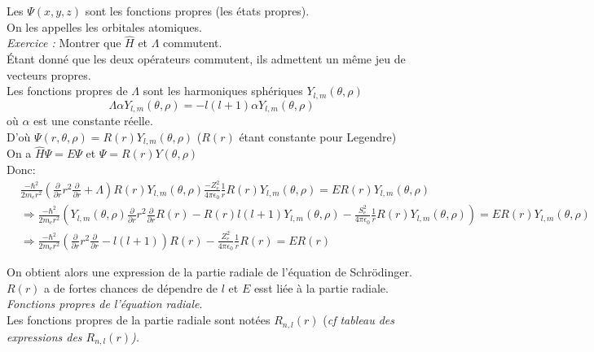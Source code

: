\documentclass[../main.tex]{subfile}
\begin{document}
 Les $\Psi(x,y,z)$ sont les fonctions propres (les états propres).\\
 On les appelles les orbitales atomiques.\\

 \emph{Exercice :} Montrer que $\hat{H}$ et $\Lambda$ commutent.\\


 Étant donné que les deux opérateurs commutent, ils admettent un même jeu de vecteurs propres.\\
 Les fonctions propres de $\Lambda$ sont les harmoniques sphériques $Y_{l,m}(\theta, \rho)$\\
 $$\Lambda \alpha Y_{l,m}(\theta, \rho) = -l(l+1) \alpha Y_{l,m}(\theta, \rho)$$
 où $\alpha$ est une constante réelle.\\

 D'où $\Psi(r, \theta, \rho) = R(r)Y_{l,m}(\theta, \rho)$ ($R(r)$ étant constante pour Legendre)\\

   On a $\hat{H}\Psi = E \Psi$ et $\Psi = R(r)Y(\theta, \rho)$\\

   Donc:
   $$
  \begin{aligned} 
     &\frac{-\hbar^2}{2m_er^2} (\frac{\partial}{\partial r} r^2 \frac{\partial}{\partial r} + \Lambda) R(r) Y_{l,m}(\theta, \rho) \frac{-Z_e^2}{4\pi\epsilon_0} \frac{1}{r} R(r) Y_{l,m}(\theta, \rho) = E R(r) Y_{l,m}(\theta, \rho)\\
     &\Rightarrow \frac{-\hbar^2}{2m_er^2} (Y_{l,m}(\theta, \rho) \frac{\partial}{\partial r} r^2 \frac{\partial}{\partial r} R(r) - R(r) l(l+1) Y_{l,m}(\theta, \rho) - \frac{S_e^2}{4\pi\epsilon_0} \frac{1}{r}R(r) Y_{l,m}(\theta, \rho)) =  E R(r) Y_{l,m}(\theta, \rho)\\
     &\Rightarrow \frac{-\hbar^2}{2m_er^2} (\frac{\partial}{\partial r} r^2 \frac{\partial}{\partial r} - l(l+1)) R(r) - \frac{Z_e^2}{4\pi\epsilon_0} \frac{1}{r} R(r) = E R(r)
  \end{aligned}$$

  On obtient alors une expression de la partie radiale de l'équation de Schrödinger.\\

  $R(r)$ a de fortes chances de dépendre de $l$ et $E$ esst liée à la partie radiale.\\


  \emph{Fonctions propres de l'équation radiale}.\\

  Les fonctions propres de la partie radiale sont notées $R_{n,l}(r)$ (\it{cf} tableau des expressions des $R_{n,l}(r)$).\\
\end{document}
